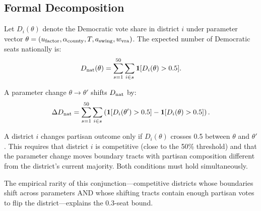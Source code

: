 \subsection{Formal Decomposition}

Let $D_i(\theta)$ denote the Democratic vote share in district $i$ under
parameter vector $\theta = (u_{\mathrm{factor}}, \alpha_{\mathrm{county}}, T, a_{\mathrm{swing}}, w_{\mathrm{vra}})$.
The expected number of Democratic seats nationally is:
\[
  D_{\mathrm{nat}}(\theta) = \sum_{s=1}^{50} \sum_{i \in s} \mathbf{1}[D_i(\theta) > 0.5].
\]

A parameter change $\theta \to \theta'$ shifts $D_{\mathrm{nat}}$ by:
\[
  \Delta D_{\mathrm{nat}} = \sum_{s=1}^{50} \sum_{i \in s}
  \left( \mathbf{1}[D_i(\theta') > 0.5] - \mathbf{1}[D_i(\theta) > 0.5] \right).
\]

A district $i$ changes partisan outcome only if $D_i(\theta)$ crosses 0.5
between $\theta$ and $\theta'$.
This requires that district $i$ is competitive (close to the 50\% threshold)
and that the parameter change moves boundary tracts with partisan
composition different from the district's current majority.
Both conditions must hold simultaneously.

The empirical rarity of this conjunction---competitive districts whose
boundaries shift across parameters AND whose shifting tracts contain
enough partisan votes to flip the district---explains the 0.3-seat bound.
